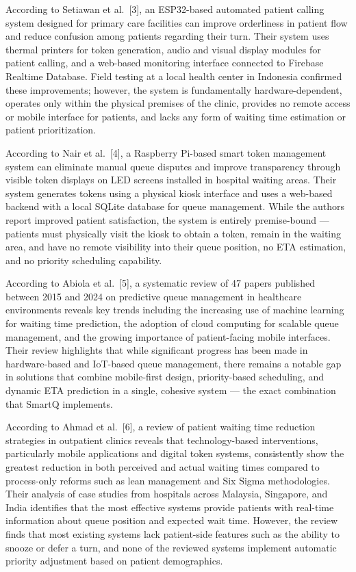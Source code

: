 \documentclass[12pt,a4paper]{article}
\begin{document}
According to Setiawan et al.~[3], an ESP32-based automated patient calling system designed for primary care facilities can improve orderliness in patient flow and reduce confusion among patients regarding their turn. Their system uses thermal printers for token generation, audio and visual display modules for patient calling, and a web-based monitoring interface connected to Firebase Realtime Database. Field testing at a local health center in Indonesia confirmed these improvements; however, the system is fundamentally hardware-dependent, operates only within the physical premises of the clinic, provides no remote access or mobile interface for patients, and lacks any form of waiting time estimation or patient prioritization.

According to Nair et al.~[4], a Raspberry Pi-based smart token management system can eliminate manual queue disputes and improve transparency through visible token displays on LED screens installed in hospital waiting areas. Their system generates tokens using a physical kiosk interface and uses a web-based backend with a local SQLite database for queue management. While the authors report improved patient satisfaction, the system is entirely premise-bound --- patients must physically visit the kiosk to obtain a token, remain in the waiting area, and have no remote visibility into their queue position, no ETA estimation, and no priority scheduling capability.

According to Abiola et al.~[5], a systematic review of 47 papers published between 2015 and 2024 on predictive queue management in healthcare environments reveals key trends including the increasing use of machine learning for waiting time prediction, the adoption of cloud computing for scalable queue management, and the growing importance of patient-facing mobile interfaces. Their review highlights that while significant progress has been made in hardware-based and IoT-based queue management, there remains a notable gap in solutions that combine mobile-first design, priority-based scheduling, and dynamic ETA prediction in a single, cohesive system --- the exact combination that SmartQ implements.

According to Ahmad et al.~[6], a review of patient waiting time reduction strategies in outpatient clinics reveals that technology-based interventions, particularly mobile applications and digital token systems, consistently show the greatest reduction in both perceived and actual waiting times compared to process-only reforms such as lean management and Six Sigma methodologies. Their analysis of case studies from hospitals across Malaysia, Singapore, and India identifies that the most effective systems provide patients with real-time information about queue position and expected wait time. However, the review finds that most existing systems lack patient-side features such as the ability to snooze or defer a turn, and none of the reviewed systems implement automatic priority adjustment based on patient demographics.
\end{document}
